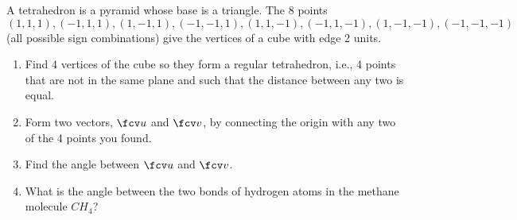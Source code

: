 A tetrahedron is a pyramid whose base is a triangle. The 8 points $(1,1,1), (-1,1,1), (1,-1,1), (-1,-1,1), (1,1,-1), (-1,1,-1), (1,-1,-1), (-1,-1,-1)$ (all possible sign combinations) give the vertices of a cube with edge 2 units. 

\begin{enumerate}
\item Find 4 vertices of the cube so they form a regular tetrahedron, i.e., 4 points that are not in the same plane and such that the distance between any two is equal.
\item Form two vectors, $\fcv u$ and $\fcv v$, by connecting the origin with any two of the 4 points you found.
\item Find the angle between $\fcv u$ and $\fcv v$.
\item What is the angle between the two bonds of hydrogen atoms in the methane molecule $CH_4$?
\end{enumerate}